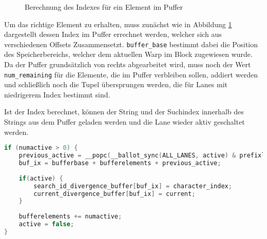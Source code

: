 \begin{figure}[ht]
	\caption{Berechnung des Indexes für ein Element im Puffer}
	\label{fig:buffer_index}
\end{figure}

Um das richtige Element zu erhalten, muss zunächst wie in Abbildung \ref{fig:buffer_index} dargestellt dessen Index im Puffer errechnet werden, welcher sich aus verschiedenen Offsets Zusammensetzt.
\texttt{buffer\_base} bestimmt dabei die Position des Speicherbereichs, welcher dem aktuellen Warp im Block zugewiesen wurde.
Da der Puffer grundsätzlich von rechts abgearbeitet wird, muss noch der Wert \texttt{num\_remaining} für die Elemente, die im Puffer verbleiben sollen, addiert werden und schließlich noch die Tupel übersprungen werden, die für Lanes mit niedrigerem Index bestimmt sind.

Ist der Index berechnet, können der String und der Suchindex innerhalb des Strings aus dem Puffer geladen werden und die Lane wieder aktiv geschaltet werden.

\begin{lstlisting}[language=C++,
caption={Auslagern übriger, aktiver Lanes in den Puffer},
label=flush_code]
if (numactive > 0) {
	previous_active = __popc(__ballot_sync(ALL_LANES, active) & prefixlanes);
	buf_ix = bufferbase + bufferelements + previous_active;
	
	if(active) {
		search_id_divergence_buffer[buf_ix] = character_index;
		current_divergence_buffer[buf_ix] = current;
	}
	
	bufferelements += numactive;
	active = false;
}
\end{lstlisting}

